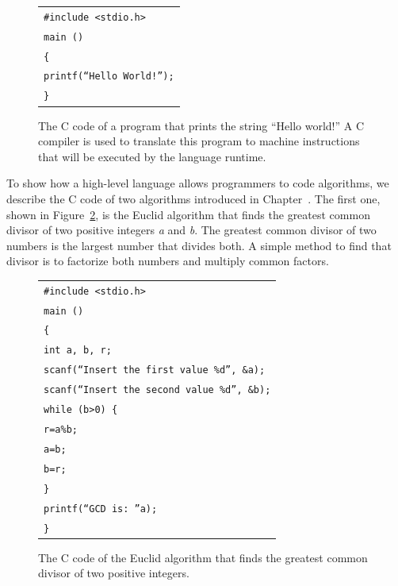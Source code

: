 \begin{figure}[!t]
\begin{tabular}{l}
\texttt{\#include <stdio.h>}\\
\texttt{main ()}\\
\texttt{\{}\\
\texttt{printf(``Hello World!'');}\\
\texttt{\}}
\end{tabular}
\caption{\label{fig:2.2}The C code of a program that prints the string ``Hello world!'' A C compiler is used to translate this program to machine instructions that will be executed by the language runtime.}
\end{figure}

To show how a high-level language allows programmers to code algorithms, we describe the C code of two algorithms introduced in Chapter~. The first one, shown in Figure~\ref{fig:2.3}, is the Euclid algorithm that finds the greatest common divisor of two positive integers \textit{a} and \textit{b}. The greatest common divisor of two numbers is the largest number that divides both. A simple method to find that divisor is to factorize both numbers and multiply common factors.


\begin{figure}[!b]
\begin{tabular}{l}
\texttt{\#include <stdio.h>}\\
\texttt{main ()}\\
\texttt{\{}\\
\texttt{int a, b, r;}\\
\texttt{scanf(``Insert the first value \%d'', \&a);}\\
\texttt{scanf(``Insert the second value \%d'', \&b);}\\
\texttt{while (b>0) \{}\\
\quad\texttt{r=a\%b;}\\
\quad\texttt{a=b;}\\
\quad\texttt{b=r;}\\
\texttt{\}}\\
\texttt{printf(``GCD is: ''a);}\\
\texttt{\}}
\end{tabular}
\caption{\label{fig:2.3}The C code of the Euclid algorithm that finds the greatest common divisor of two positive integers.}
\end{figure}


